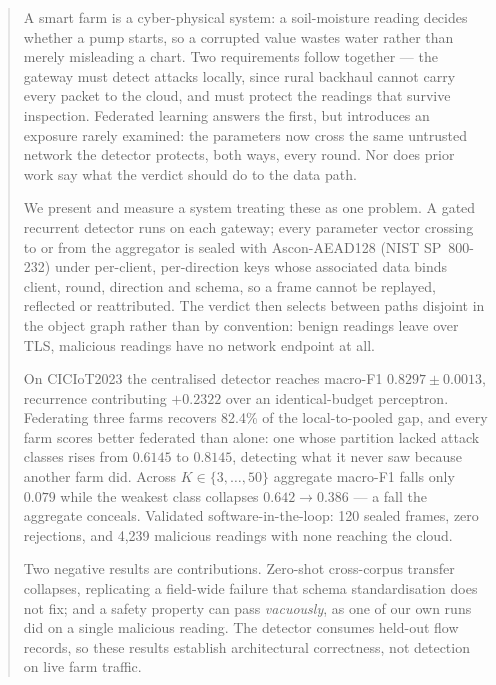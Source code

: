 \documentclass[conference]{IEEEtran}
\begin{document}
\begin{abstract}
A smart farm is a cyber-physical system: a soil-moisture reading decides whether a pump starts, so
a corrupted value wastes water rather than merely misleading a chart. Two requirements follow
together --- the gateway must detect attacks locally, since rural backhaul cannot carry every
packet to the cloud, and must protect the readings that survive inspection. Federated learning
answers the first, but introduces an exposure rarely examined: the parameters now cross the same
untrusted network the detector protects, both ways, every round. Nor does prior work say what the
verdict should do to the data path.

We present and measure a system treating these as one problem. A gated recurrent detector runs on
each gateway; every parameter vector crossing to or from the aggregator is sealed with
Ascon-AEAD128 (NIST SP~800-232) under per-client, per-direction keys whose associated data binds
client, round, direction and schema, so a frame cannot be replayed, reflected or reattributed. The
verdict then selects between paths disjoint in the object graph rather than by convention: benign
readings leave over TLS, malicious readings have no network endpoint at all.

On CICIoT2023 the centralised detector reaches macro-F1 $0.8297 \pm 0.0013$, recurrence
contributing $+0.2322$ over an identical-budget perceptron. Federating three farms recovers 82.4\%
of the local-to-pooled gap, and every farm scores better federated than alone: one whose partition
lacked attack classes rises from $0.6145$ to $0.8145$, detecting what it never saw because another
farm did. Across $K \in \{3,\dots,50\}$ aggregate macro-F1 falls only $0.079$ while the weakest
class collapses $0.642 \rightarrow 0.386$ --- a fall the aggregate conceals. Validated
software-in-the-loop: 120 sealed frames, zero rejections, and 4{,}239 malicious readings with none
reaching the cloud.

Two negative results are contributions. Zero-shot cross-corpus transfer collapses, replicating a
field-wide failure that schema standardisation does not fix; and a safety property can pass
\emph{vacuously}, as one of our own runs did on a single malicious reading. The detector consumes
held-out flow records, so these results establish architectural correctness, not detection on live
farm traffic.
\end{abstract}
\end{document}
